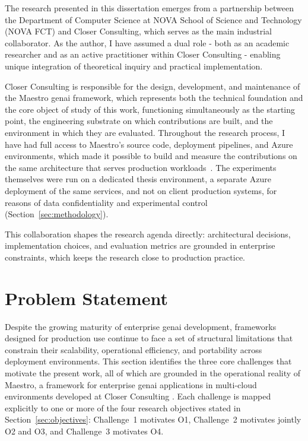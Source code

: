 The research presented in this dissertation emerges from a partnership between the Department of Computer Science at NOVA School of Science and Technology (NOVA FCT) and Closer Consulting, which serves as the main industrial collaborator. As the author, I have assumed a dual role - both as an academic researcher and as an active practitioner within Closer Consulting - enabling unique integration of theoretical inquiry and practical implementation. 

Closer Consulting is responsible for the design, development, and maintenance of the Maestro \gls{genai} framework, which represents both the technical foundation and the core object of study of this work, functioning simultaneously as the starting point, the engineering substrate on which contributions are built, and the environment in which they are evaluated. Throughout the research process, I have had full access to Maestro's source code, deployment pipelines, and Azure environments, which made it possible to build and measure the contributions on the same architecture that serves production workloads~\cite{closer2025maestro}. The experiments themselves were run on a dedicated thesis environment, a separate Azure deployment of the same services, and not on client production systems, for reasons of data confidentiality and experimental control (Section~\ref{sec:methodology}).

This collaboration shapes the research agenda directly: architectural decisions, implementation choices, and evaluation metrics are grounded in enterprise constraints, which keeps the research close to production practice.


\section{Problem Statement}
\label{sec:Problem-Statement}

Despite the growing maturity of enterprise \gls{genai} development, frameworks designed for production use continue to face a set of structural limitations that constrain their scalability, operational efficiency, and portability across deployment environments. This section identifies the three core challenges that motivate the present work, all of which are grounded in the operational reality of Maestro, a framework for enterprise \gls{genai} applications in multi-cloud environments developed at Closer Consulting \cite{closer2025maestro}. Each challenge is mapped explicitly to one or more of the four research objectives stated in Section~\ref{sec:objectives}: Challenge~1 motivates O1, Challenge~2 motivates jointly O2 and O3, and Challenge~3 motivates O4.

